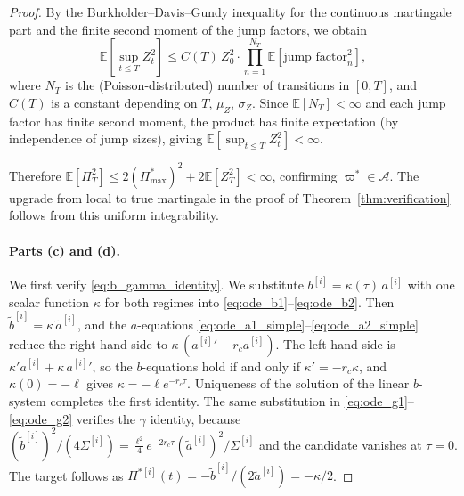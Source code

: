 \documentclass[11pt,a4paper]{article}
\numberwithin{equation}{section}
\newcommand{\E}{\mathbb{E}}
\begin{document}
\begin{appendices}
\begin{proof}
By the Burkholder--Davis--Gundy inequality for the continuous martingale part and the finite second moment of the jump factors, we obtain
\[
\E\!\left[\sup_{t \leq T} Z_t^2\right] \leq C(T)\, Z_0^2 \cdot \prod_{n=1}^{N_T} \E\!\left[\text{jump factor}_n^2\right],
\]
where $N_T$ is the (Poisson-distributed) number of transitions in $[0, T]$, and $C(T)$ is a constant depending on $T$, $\mu_Z$, $\sigma_Z$.  Since $\E[N_T] < \infty$ and each jump factor has finite second moment, the product has finite expectation (by independence of jump sizes), giving $\E[\sup_{t \leq T} Z_t^2] < \infty$.

Therefore $\E[\Pi_T^2] \leq 2(\Pi^{*}_{\max})^2 + 2\E[Z_T^2] < \infty$, confirming $\varpi^* \in \mathcal{A}$.  The upgrade from local to true martingale in the proof of Theorem~\ref{thm:verification} follows from this uniform integrability.

\paragraph{Parts (c) and (d).}\label{app:moments_proof}

We first verify \eqref{eq:b_gamma_identity}. We substitute $b^{[i]} = \kappa(\tau)\, a^{[i]}$ with one scalar function $\kappa$ for both regimes into \eqref{eq:ode_b1}--\eqref{eq:ode_b2}. Then $\tilde{b}^{[i]} = \kappa\, \tilde{a}^{[i]}$, and the $a$-equations \eqref{eq:ode_a1_simple}--\eqref{eq:ode_a2_simple} reduce the right-hand side to $\kappa\,({a^{[i]}}' - r_c a^{[i]})$. The left-hand side is $\kappa' a^{[i]} + \kappa\, {a^{[i]}}'$, so the $b$-equations hold if and only if $\kappa' = -r_c \kappa$, and $\kappa(0) = -\ell$ gives $\kappa = -\ell e^{-r_c\tau}$. Uniqueness of the solution of the linear $b$-system completes the first identity. The same substitution in \eqref{eq:ode_g1}--\eqref{eq:ode_g2} verifies the $\gamma$ identity, because $(\tilde{b}^{[i]})^2/(4\Sigma^{[i]}) = \tfrac{\ell^2}{4} e^{-2r_c\tau} (\tilde{a}^{[i]})^2/\Sigma^{[i]}$ and the candidate vanishes at $\tau = 0$. The target follows as $\Pi^{*[i]}(t) = -\tilde{b}^{[i]}/(2\tilde{a}^{[i]}) = -\kappa/2$.


\end{proof}
\end{appendices}
\end{document}
